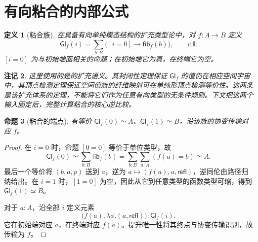 \documentclass[12pt,oneside,openany,fontset=none]{ctexbook}
\theoremstyle{cn}
\newtheorem{definition}{定义}[chapter]
\newtheorem{proposition}[definition]{命题}
\newtheorem{remark}[definition]{注记}
\numberwithin{equation}{chapter}
\newcommand{\refl}{\mathsf{refl}}
\newcommand{\fib}{\mathsf{fib}}
\newcommand{\Int}{\mathbb I}
\begin{document}
\section{有向粘合的内部公式}
\begin{definition}[粘合族]
在具备有向单纯模态结构的扩充类型论中，对 $f:A\to B$ 定义
\[
\mathsf{Gl}_f(i)
=\sum_{b:B}\bigl([i=0]\to\fib_f(b)\bigr),
\qquad i:\Int.
\]
$[i=0]$ 为与初始端面相关的命题；在初始端它为真，在终端它为空。
\end{definition}
\begin{remark}
这里使用的是\cite{GratzerWeinbergerBuchholtz}的扩充语义。其封闭性定理保证 $\mathsf{Gl}_f$ 的值仍在相应空间宇宙中，其顶点检测定理保证空间值族的纤维映射可在单纯形顶点检测等价性。这两条是该扩充体系的定理，不能将它们作为任意有向类型的无条件规则。下文把这两个输入固定后，完整计算粘合的核心逆比较。
\end{remark}
\begin{proposition}[粘合的端点]
有等价 $\mathsf{Gl}_f(0)\simeq A$、$\mathsf{Gl}_f(1)\simeq B$，沿该族的协变传输对应 $f$。
\end{proposition}
\begin{proof}
在 $i=0$ 时，命题 $[0=0]$ 等价于单位类型，故
\[
\mathsf{Gl}_f(0)
\simeq\sum_{b:B}\fib_f(b)
=\sum_{b:B}\sum_{a:A}(f(a)=b)
\simeq A.
\]
最后一个等价将 $(b,a,p)$ 送到 $a$，逆为 $a\mapsto(f(a),a,\refl)$，逆同伦由路径归纳给出。在 $i=1$ 时，$[1=0]$ 为空，因此从它到任意类型的函数类型可缩，得到 $\mathsf{Gl}_f(1)\simeq B$。

对于 $a:A$，沿全部 $i$ 定义元素
\[
\bigl(f(a),\lambda\phi.(a,\refl)\bigr):\mathsf{Gl}_f(i).
\]
它在初始端对应 $a$，在终端对应 $f(a)$。提升唯一性将其终点与协变传输识别，故传输为 $f$。
\end{proof}
\end{document}
